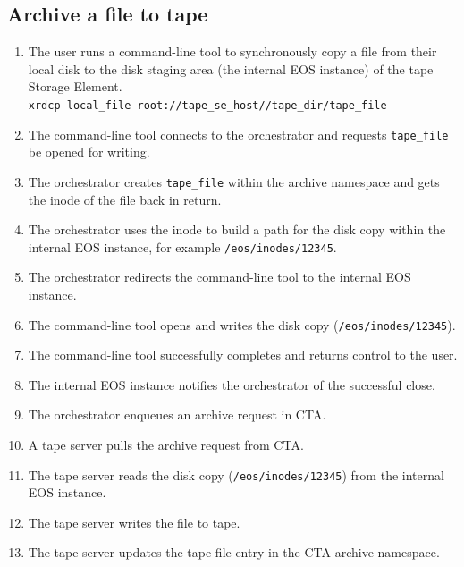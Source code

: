 \documentclass{article}
\begin{document}
\subsection{Archive a file to tape}
\begin{enumerate}
	\item The user runs a command-line tool to synchronously copy a file from their local disk to the disk staging area (the internal EOS instance) of the tape Storage Element. \\
	\texttt{xrdcp local\_file root://tape\_se\_host//tape\_dir/tape\_file}
	\item The command-line tool connects to the orchestrator and requests \texttt{tape\_file} be opened for writing.
	\item The orchestrator creates \texttt{tape\_file} within the archive namespace and gets the inode of the file back in return.
	\item The orchestrator uses the inode to build a path for the disk copy within the internal EOS instance, for example \texttt{/eos/inodes/12345}.
	\item The orchestrator redirects the command-line tool to the internal EOS instance.
	\item The command-line tool opens and writes the disk copy (\texttt{/eos/inodes/12345}).
	\item The command-line tool successfully completes and returns control to the user.
	\item The internal EOS instance notifies the orchestrator of the successful close.
	\item The orchestrator enqueues an archive request in CTA.
	\item A tape server pulls the archive request from CTA.
	\item The tape server reads the disk copy (\texttt{/eos/inodes/12345}) from the internal EOS instance.
	\item The tape server writes the file to tape.
	\item The tape server updates the tape file entry in the CTA archive namespace.
\end{enumerate}
\end{document}
